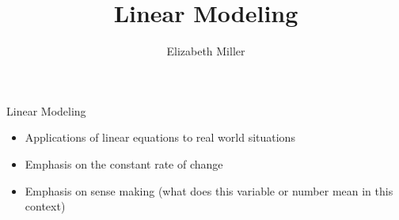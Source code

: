 \documentclass{ximera}
\author{Elizabeth Miller}
\title{Linear Modeling}
\begin{document}
\begin{abstract}
\end{abstract}
\maketitle


\begin{objectives}

\item Linear Modeling
\begin{itemize}
	\item Applications of linear equations to real world situations 
	\item Emphasis on the constant rate of change 
	\item Emphasis on sense making (what does this variable or number mean in this context) 
\end{itemize}




\end{objectives}
\end{document}

